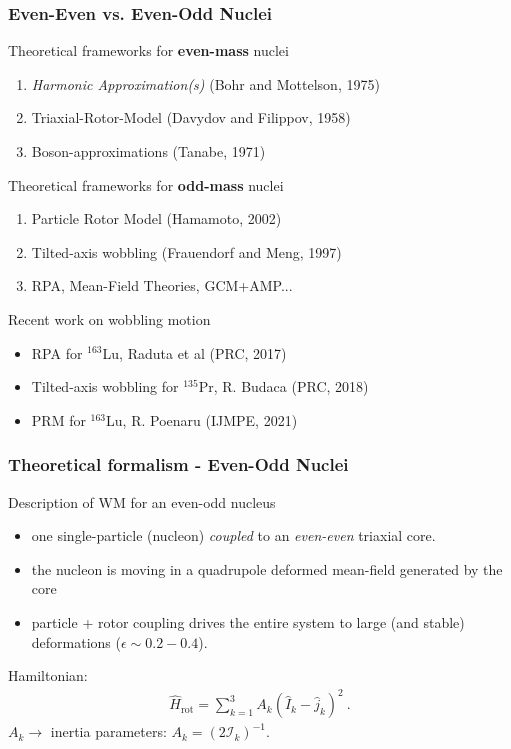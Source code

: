 \documentclass{beamer}
\begin{document}
\begin{frame}
  \frametitle{Even-Even vs. Even-Odd Nuclei}
\begin{block}{Theoretical frameworks for \textbf{even-mass} nuclei}
  \begin{enumerate}
    \item \emph{Harmonic Approximation(s)} (Bohr and Mottelson, 1975)
    \item Triaxial-Rotor-Model (Davydov and Filippov, 1958)
    \item Boson-approximations (Tanabe, 1971)
  \end{enumerate}
\end{block}

\begin{block}{Theoretical frameworks for \textbf{odd-mass} nuclei}
  \begin{enumerate}
    \item Particle Rotor Model (Hamamoto, 2002)
    \item Tilted-axis wobbling (Frauendorf and Meng, 1997)
    \item RPA, Mean-Field Theories, GCM+AMP...
  \end{enumerate}
\end{block}

\begin{exampleblock}{Recent work on wobbling motion}
  \begin{itemize}
    \item RPA for $^{163}$Lu, Raduta et al (PRC, 2017)
    \item Tilted-axis wobbling for $^{135}$Pr, R. Budaca (PRC, 2018)
    \item PRM for $^{163}$Lu, R. Poenaru (IJMPE, 2021)
  \end{itemize}
\end{exampleblock}

\end{frame}

\begin{frame}
  \frametitle{Theoretical formalism - Even-Odd Nuclei}
  \begin{exampleblock}{Description of WM for an even-odd nucleus}
    \begin{itemize}
      \item one single-particle (nucleon) \emph{coupled} to an \emph{even-even} triaxial core.
      \item the nucleon is moving in a quadrupole deformed mean-field generated by the core
      \item particle + rotor coupling drives the entire system to large (and stable) deformations ($\epsilon\sim0.2-0.4$).
    \end{itemize}
  \end{exampleblock}
Hamiltonian:
\begin{align}
  \hat{H}_\text{rot}=\sum_{k=1}^3A_k\left(\hat{I}_k-\hat{j}_k\right)^2\ .
\end{align}
$A_k\rightarrow$ inertia parameters: $A_k=(2\mathcal{I}_k)^{-1}$.
\end{frame}
\end{document}
